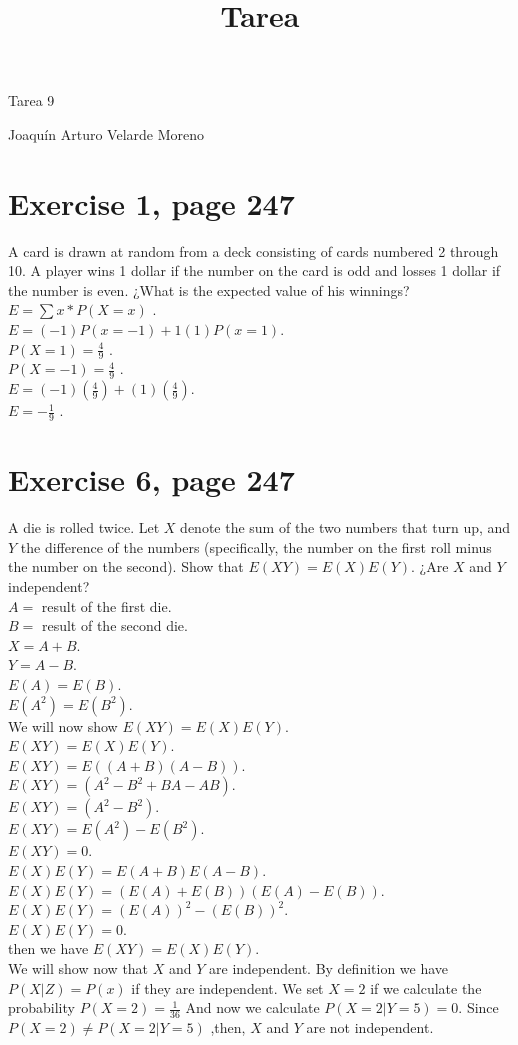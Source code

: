 \documentclass[]{article}
\title{Tarea}
\date{}
\begin{document}
\begin{center}


\centerline{Tarea 9}

\centerline{Joaquín Arturo Velarde Moreno}


\end{center}
	

\section{Exercise 1, page 247}
A card is drawn at random from a deck consisting of cards numbered 2 through 10. A player wins 1 dollar if the number on the card is odd and losses 1 dollar if the number is even. ¿What is the expected value of his winnings?\\
$E = \sum x *P(X=x)$ .\\
$E = (-1)P(x=-1) + 1(1)P(x=1)$.\\
$P(X=1) = \frac{4}{9}$ .\\
$P(X=-1) = \frac{4}{9}$ .\\
$E = (-1)(\frac{4}{9}) +(1)(\frac{4}{9})$. \\
$E = -\frac{1}{9}$ .\\
\section{Exercise 6, page 247}
A die is rolled twice. Let $X$ denote the sum of the two numbers that turn up, and $Y$ the difference of the numbers (specifically, the number on the first roll minus the number on the second). Show that $E(XY) = E(X)E(Y)$. ¿Are $X$ and $Y$ independent?\\
$A =$ result of the first die. \\
$B =$ result of the second die.\\
$X = A + B$. \\
$Y = A - B$. \\
$E(A) = E(B)$.\\
$E(A^{2}) = E(B^{2})$.\\
We will now show $E(XY) = E(X)E(Y)$.\\
$E(XY) = E(X)E(Y)$. \\
$E(XY) = E((A+B)(A-B))$. \\
$E(XY) = (A^{2} - B^{2}+ BA -AB)$. \\
$E(XY) = (A^{2} - B^{2})$. \\
$E(XY) = E(A^{2}) - E(B^{2})$. \\
$E(XY) = 0$. \\
$E(X)E(Y) = E(A+B)E(A-B)$.\\
$E(X)E(Y) = (E(A)+E(B))(E(A)-E(B))$.\\
$E(X)E(Y) = (E(A))^{2}-(E(B))^{2}$.\\
$E(X)E(Y) = 0$.\\
then we have $E(XY) = E(X)E(Y)$.\\
We will show now that $X$ and $Y$ are independent.
By definition we have $P(X|Z)= P(x)$ if they are independent.
We set $X = 2$ if we calculate the probability $P(X = 2) = \frac{1}{36} $ And now we calculate $P(X = 2|Y=5) = 0$.
Since $P(X = 2) \neq P(X = 2|Y=5)$ ,then, $X$ and $Y$ are not independent.
\end{document}
